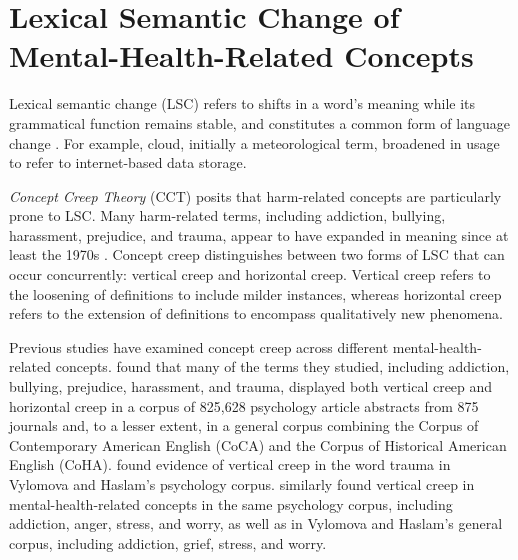 \section{Lexical Semantic Change of Mental-Health-Related Concepts}

Lexical semantic change (LSC) refers to shifts in a word's meaning while its grammatical function remains stable, and constitutes a common form of language change \citep{campbellHistoricalLinguisticsIntroduction2013}. For example, cloud, initially a meteorological term, broadened in usage to refer to internet-based data storage.

\textit{Concept Creep Theory} (CCT) posits that harm-related concepts are particularly prone to LSC. Many harm-related terms, including addiction, bullying, harassment, prejudice, and trauma, appear to have expanded in meaning since at least the 1970s \citep{haslamConceptCreepPsychologys2016,haslamHarmInflationMaking2020}. Concept creep distinguishes between two forms of LSC that can occur concurrently: vertical creep and horizontal creep. Vertical creep refers to the loosening of definitions to include milder instances, whereas horizontal creep refers to the extension of definitions to encompass qualitatively new phenomena.

Previous studies have examined concept creep across different mental-health-related concepts. \citet{vylomovaSemanticChangesHarmrelated2021} found that many of the terms they studied, including addiction, bullying, prejudice, harassment, and trauma, displayed both vertical creep and horizontal creep in a corpus of 825,628 psychology article abstracts from 875 journals and, to a lesser extent, in a general corpus combining the Corpus of Contemporary American English (CoCA) and the Corpus of Historical American English (CoHA). \citet{baesSemanticInflationTrauma2023} found evidence of vertical creep in the word trauma in Vylomova and Haslam's psychology corpus. \citet{baesSemanticShiftsMental2023} similarly found vertical creep in mental-health-related concepts in the same psychology corpus, including addiction, anger, stress, and worry, as well as in Vylomova and Haslam's general corpus, including addiction, grief, stress, and worry.

